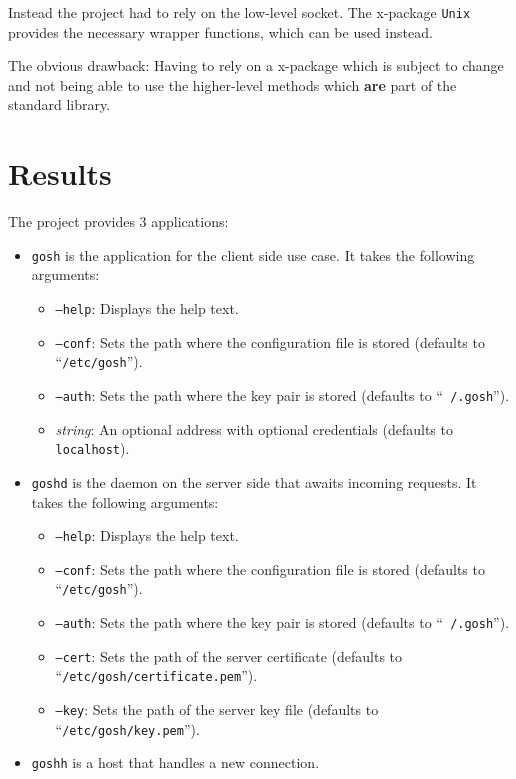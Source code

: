 \documentclass[10pt,a4paper,titlepage,twoside,english,final]{zhawreprt}
\begin{document}
Instead the project had to rely on the low-level \gls{socket}.
The \gls{x-package} \texttt{Unix} provides the necessary wrapper functions, which can be used instead.

The obvious drawback: Having to rely on a \gls{x-package} which is subject to change and not being able to use the higher-level methods which \textbf{are} part of the standard library.


\chapter{Results}\label{chp:Results}
The project provides 3 applications:
\begin{itemize}
\item \texttt{gosh} is the application for the client side use case.
It takes the following arguments:
\begin{itemize}
\item \texttt{--help}: Displays the help text.
\item \texttt{--conf}: Sets the path where the configuration file is stored (defaults to ``\texttt{/etc/gosh}'').
\item \texttt{--auth}: Sets the path where the key pair is stored (defaults to ``\texttt{~/.gosh}'').
\item \textit{string}: An optional address with optional credentials (defaults to \texttt{localhost}).
\end{itemize}
\item \texttt{goshd} is the daemon on the server side that awaits incoming requests.
It takes the following arguments:
\begin{itemize}
\item \texttt{--help}: Displays the help text.
\item \texttt{--conf}: Sets the path where the configuration file is stored (defaults to ``\texttt{/etc/gosh}'').
\item \texttt{--auth}: Sets the path where the key pair is stored (defaults to ``\texttt{~/.gosh}'').
\item \texttt{--cert}: Sets the path of the server certificate (defaults to ``\texttt{/etc/gosh/certifi\linebreak{}cate.pem}'').
\item \texttt{--key}: Sets the path of the server key file (defaults to ``\texttt{/etc/gosh/key.pem}'').
\end{itemize}
\item \texttt{goshh} is a host that handles a new connection.

\end{itemize}
\end{document}

